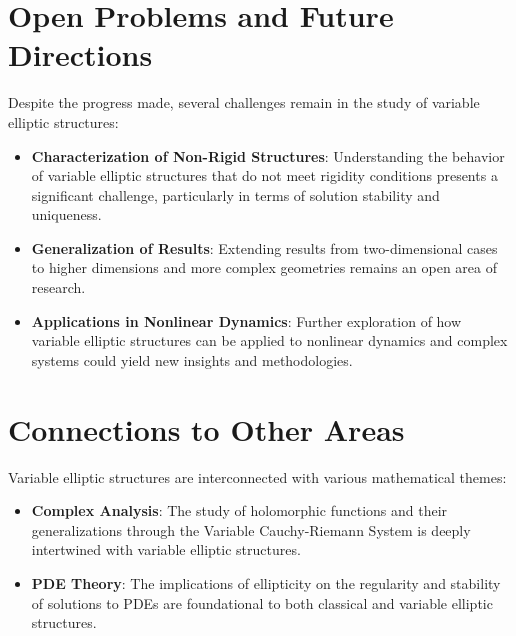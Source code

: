 \documentclass[11pt,a4paper]{article}
\begin{document}
\section{Open Problems and Future Directions}

Despite the progress made, several challenges remain in the study of variable elliptic structures:

\begin{itemize}
\item \textbf{Characterization of Non-Rigid Structures}: Understanding the behavior of variable elliptic structures that do not meet rigidity conditions presents a significant challenge, particularly in terms of solution stability and uniqueness.
\end{itemize}

\begin{itemize}
\item \textbf{Generalization of Results}: Extending results from two-dimensional cases to higher dimensions and more complex geometries remains an open area of research.
\end{itemize}

\begin{itemize}
\item \textbf{Applications in Nonlinear Dynamics}: Further exploration of how variable elliptic structures can be applied to nonlinear dynamics and complex systems could yield new insights and methodologies.
\end{itemize}

\section{Connections to Other Areas}

Variable elliptic structures are interconnected with various mathematical themes:

\begin{itemize}
\item \textbf{Complex Analysis}: The study of holomorphic functions and their generalizations through the Variable Cauchy-Riemann System is deeply intertwined with variable elliptic structures.
\end{itemize}

\begin{itemize}
\item \textbf{PDE Theory}: The implications of ellipticity on the regularity and stability of solutions to PDEs are foundational to both classical and variable elliptic structures.
\end{itemize}
\end{document}
